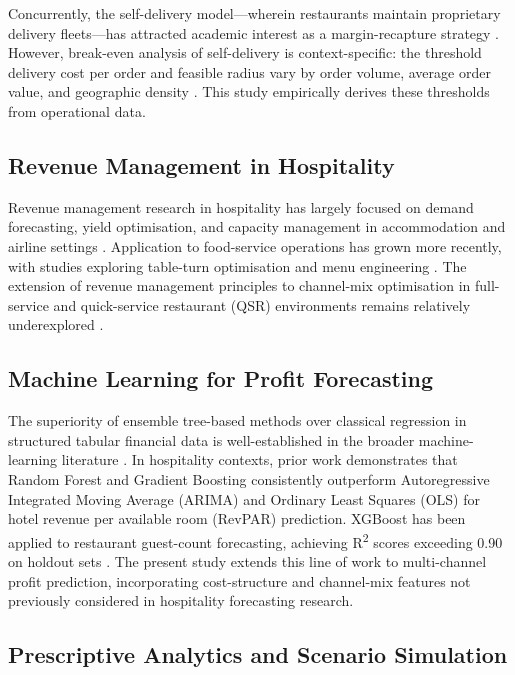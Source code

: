 \documentclass[10pt,a4paper,twocolumn]{article}
\begin{document}
Concurrently, the self-delivery model—wherein restaurants maintain proprietary delivery
fleets—has attracted academic interest as a margin-recapture strategy \citep{cachon2022ownership}.
However, break-even analysis of self-delivery is context-specific: the threshold delivery
cost per order and feasible radius vary by order volume, average order value, and geographic
density \citep{wang2022lastmile}. This study empirically derives these thresholds from
operational data.

\subsection{Revenue Management in Hospitality}

Revenue management research in hospitality has largely focused on demand forecasting,
yield optimisation, and capacity management in accommodation and airline settings
\citep{okumus2020revenue}. Application to food-service operations has grown more
recently, with studies exploring table-turn optimisation and menu engineering
\citep{kwong2020menu}. The extension of revenue management principles to channel-mix
optimisation in full-service and quick-service restaurant (QSR) environments remains
relatively underexplored \citep{zhong2020forecasting}.

\subsection{Machine Learning for Profit Forecasting}

The superiority of ensemble tree-based methods over classical regression in
structured tabular financial data is well-established in the broader machine-learning
literature \citep{chen2016xgboost}. In hospitality contexts, prior work demonstrates
that Random Forest and Gradient Boosting consistently outperform Autoregressive Integrated
Moving Average (ARIMA) and Ordinary Least Squares (OLS) for hotel revenue per available
room (RevPAR) prediction. XGBoost has been applied to restaurant guest-count forecasting,
achieving R\textsuperscript{2} scores exceeding 0.90 on holdout sets \citep{zhong2020forecasting}.
The present study extends this line of work to multi-channel profit prediction, incorporating
cost-structure and channel-mix features not previously considered in hospitality forecasting
research.

\subsection{Prescriptive Analytics and Scenario Simulation}
\end{document}
